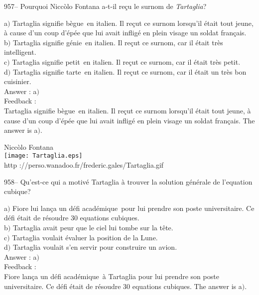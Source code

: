 \documentclass[letterpaper, 12pt]{article}
\begin{document}
957-- Pourquoi Nicc\`olo Fontana a-t-il re\c cu le surnom de {\sl
Tartaglia}?

a$)$ Tartaglia signifie \og b\`egue\fg\ en italien. Il re\c cut ce
surnom lorsqu'il \'etait tout jeune, \`a cause d'un coup d'\'ep\'ee
que lui avait inflig\'e en plein visage un
soldat fran\c cais. \\
b$)$ Tartaglia signifie \og g\'enie\fg\ en italien. Il re\c cut ce
surnom, car il
\'etait tr\`es intelligent.  \\
c$)$ Tartaglia signifie \og petit\fg\ en italien. Il re\c cut ce
surnom, car il \'etait tr\`es petit.  \\
d$)$ Tartaglia signifie \og tarte\fg\ en italien. Il re\c cut ce
surnom, car il \'etait un tr\`es bon cuisinier.\\

Answer : a$)$\\

Feedback :\\
Tartaglia signifie \og b\`egue\fg\ en italien. Il re\c cut ce surnom
lorsqu'il \'etait tout jeune, \`a cause d'un coup d'\'ep\'ee  que
lui avait inflig\'e en plein visage un
soldat fran\c cais. The answer is a$)$.\\

        \begin{center}
        Nicc\`olo Fontana\\
    \texttt{[image: Tartaglia.eps]}\\
        {\footnotesize http
://perso.wanadoo.fr/frederic.gales/Tartaglia.gif}
    \end{center}

958-- Qu'est-ce qui a motiv\'e Tartaglia \`a trouver la solution
g\'en\'erale de l'equation cubique?

a$)$ Fiore lui lan\c ca un \og d\'efi acad\'emique\fg\ pour lui
prendre son poste universitaire. Ce d\'efi \'etait
de r\'esoudre 30 equations cubiques. \\
b$)$ Tartaglia avait peur que le ciel lui tombe sur la t\^ete.   \\
c$)$ Tartaglia voulait \'evaluer la position de la Lune.   \\
d$)$ Tartaglia voulait s'en servir pour construire un avion. \\

Answer : a$)$\\

Feedback : \\
Fiore lan\c ca un \og d\'efi acad\'emique\fg\ \`a Tartaglia pour lui
prendre son poste universitaire. Ce d\'efi \'etait
de r\'esoudre 30 equations cubiques. The answer is a$)$.\\
\end{document}
